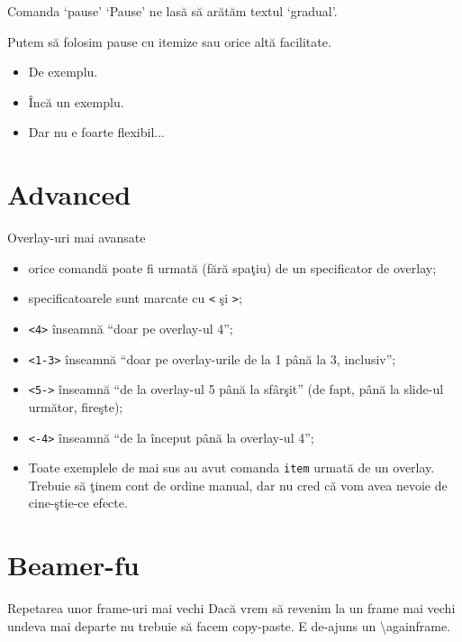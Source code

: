 \documentclass{beamer}
\begin{document}
\begin{frame}{Comanda `pause'}
  `Pause' ne lasă să arătăm textul `gradual'.

  \pause Putem să folosim pause cu itemize sau orice altă facilitate.
  \begin{itemize}
    \pause \item De exemplu.
    \pause \item Încă un exemplu.
    \pause \item Dar nu e foarte flexibil...
  \end{itemize}
\end{frame}

\section{Advanced}

\begin{frame}{Overlay-uri mai avansate}
  \begin{itemize}
  \item<3-> orice comandă poate fi urmată (fără spaţiu) de un specificator de
    overlay;
  \item<4-> specificatoarele sunt marcate cu \texttt{<} şi \texttt{>};
  \item<5-> \texttt{<4>} înseamnă ``doar pe overlay-ul 4'';
  \item<5-> \texttt{<1-3>} înseamnă ``doar pe overlay-urile de la 1 până la 3,
    inclusiv'';
  \item<6-> \texttt{<5->} înseamnă ``de la overlay-ul 5 până la sfârşit'' (de
    fapt, până la slide-ul următor, fireşte);
  \item<6-> \texttt{<-4>} înseamnă ``de la început până la overlay-ul 4'';
  \item<7-> Toate exemplele de mai sus au avut comanda \texttt{item} urmată de
    un overlay. Trebuie să ţinem cont de ordine manual, dar nu cred că vom avea
    nevoie de cine-ştie-ce efecte.
  \end{itemize}
\end{frame}

\section{Beamer-fu}
\begin{frame}{Repetarea unor frame-uri mai vechi}
Dacă vrem să revenim la un frame mai vechi undeva mai departe nu trebuie să
facem copy-paste. E de-ajuns un \textbackslash againframe.
\end{frame}
\end{document}
